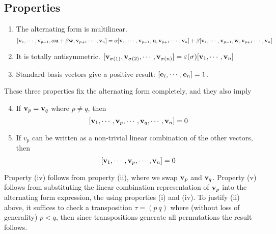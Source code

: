 \subsection{Properties}
\begin{enumerate}
	\item The alternating form is multilinear.
	      \[
		      [ \vb v_1, \cdots, \vb v_{p-1}, \alpha \vb u + \beta \vb w, \vb v_{p+1} \cdots, \vb v_n ] = \alpha [ \vb v_1, \cdots, \vb v_{p-1}, \vb u, \vb v_{p+1} \cdots, \vb v_n ] + \beta [ \vb v_1, \cdots, \vb v_{p-1}, \vb w, \vb v_{p+1} \cdots, \vb v_n ]
	      \]
	\item It is totally antisymmetric.
	      \([ \vb v_{\sigma(1)}, \vb v_{\sigma(2)}, \cdots, \vb v_{\sigma(n)} ] = \varepsilon(\sigma) [ \vb v_1, \cdots, \vb v_n ]\)
	\item Standard basis vectors give a positive result: \([\vb e_i, \cdots, \vb e_n] = 1\).
\end{enumerate}
These three properties fix the alternating form completely, and they also imply
\begin{enumerate}
	\setcounter{enumi}{3}
	\item If \(\vb v_p = \vb v_q\) where \(p \neq q\), then
	      \[
		      [\vb v_1, \cdots, \vb v_p, \cdots, \vb v_q, \cdots, \vb v_n ] = 0
	      \]
	\item If \(v_p\) can be written as a non-trivial linear combination of the other vectors, then
	      \[
		      [\vb v_1, \cdots, \vb v_p, \cdots, \vb v_n ] = 0
	      \]
\end{enumerate}
Property (iv) follows from property (ii), where we swap \(\vb v_p\) and \(\vb v_q\).
Property (v) follows from substituting the linear combination representation of \(\vb v_p\) into the alternating form expression, the using properties (i) and (iv).
To justify (ii) above, it suffices to check a transposition \(\tau = (p\ q)\) where (without loss of generality) \(p < q\), then since transpositions generate all permutations the result follows.
